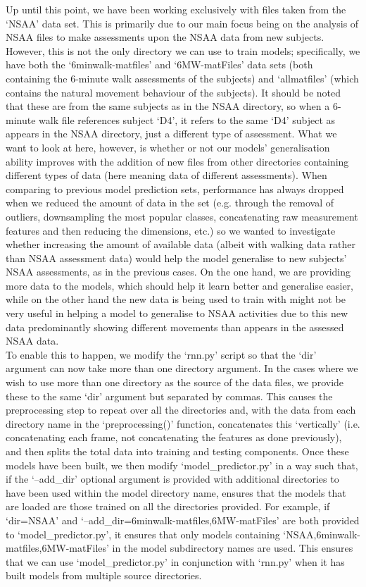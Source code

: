 \documentclass[12pt,twoside]{report}
\begin{document}
\quad Up until this point, we have been working exclusively with files taken from the ‘NSAA’ data set. This is primarily due to our main focus being on the analysis of NSAA files to make assessments upon the NSAA data from new subjects. However, this is not the only directory we can use to train models; specifically, we have both the ‘6minwalk-matfiles’ and ‘6MW-matFiles’ data sets (both containing the 6-minute walk assessments of the subjects) and ‘allmatfiles’ (which contains the natural movement behaviour of the subjects). It should be noted that these are from the same subjects as in the NSAA directory, so when a 6-minute walk file references subject ‘D4’, it refers to the same ‘D4’ subject as appears in the NSAA directory, just a different type of assessment. What we want to look at here, however, is whether or not our models’ generalisation ability improves with the addition of new files from other directories containing different types of data (here meaning data of different assessments). When comparing to previous model prediction sets, performance has always dropped when we reduced the amount of data in the set (e.g. through the removal of outliers, downsampling the most popular classes, concatenating raw measurement features and then reducing the dimensions, etc.) so we wanted to investigate whether increasing the amount of available data (albeit with walking data rather than NSAA assessment data) would help the model generalise to new subjects’ NSAA assessments, as in the previous cases. On the one hand, we are providing more data to the models, which should help it learn better and generalise easier, while on the other hand the new data is being used to train with might not be very useful in helping a model to generalise to NSAA activities due to this new data predominantly showing different movements than appears in the assessed NSAA data.\\

\quad To enable this to happen, we modify the ‘rnn.py’ script so that the ‘dir’ argument can now take more than one directory argument. In the cases where we wish to use more than one directory as the source of the data files, we provide these to the same ‘dir’ argument but separated by commas. This causes the preprocessing step to repeat over all the directories and, with the data from each directory name in the ‘preprocessing()’ function, concatenates this ‘vertically’ (i.e. concatenating each frame, not concatenating the features as done previously), and then splits the total data into training and testing components. Once these models have been built, we then modify ‘model\_predictor.py’ in a way such that, if the ‘--add\_dir’ optional argument is provided with additional directories to have been used within the model directory name, ensures that the models that are loaded are those trained on all the directories provided. For example, if ‘dir=NSAA’ and ‘--add\_dir=6minwalk-matfiles,6MW-matFiles’ are both provided to ‘model\_predictor.py’, it ensures that only models containing ‘NSAA,6minwalk-matfiles,6MW-matFiles’ in the model subdirectory names are used. This ensures that we can use ‘model\_predictor.py’ in conjunction with ‘rnn.py’ when it has built models from multiple source directories.
\end{document}
